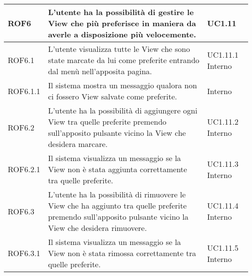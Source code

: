 \begin{center}
\begin{longtable}{| p{2.5cm} | p{8cm} | p{2cm} |}
		ROF6  & L'utente ha la possibilità di gestire le View che più preferisce in maniera da averle a disposizione più velocemente. & UC1.11 \\
		\hline
		ROF6.1  & L'utente visualizza tutte le View che sono state marcate da lui come preferite entrando dal menù nell'apposita pagina. & UC1.11.1 \newline Interno \\
		\hline
		ROF6.1.1  & Il sistema mostra un messaggio qualora non ci fossero View salvate come preferite. &  Interno \\
		\hline
		ROF6.2  & L'utente ha la possibilità di aggiungere ogni View tra quelle preferite premendo sull'apposito pulsante vicino la View che desidera marcare.  & UC1.11.2 \newline Interno \\
		\hline
		ROF6.2.1  & Il sistema visualizza un messaggio se la View non è stata aggiunta correttamente tra quelle preferite.  & UC1.11.3 \newline Interno \\
		\hline
		ROF6.3  & L'utente ha la possibilità di rimuovere le View che ha aggiunto tra quelle preferite premendo sull'apposito pulsante vicino la View che desidera rimuovere.  &  UC1.11.4 \newline Interno \\
		\hline
		ROF6.3.1  & Il sistema visualizza un messaggio se la View non è stata rimossa correttamente tra quelle preferite.  & UC1.11.5 \newline Interno \\
		\hline




\end{longtable}
\end{center}
